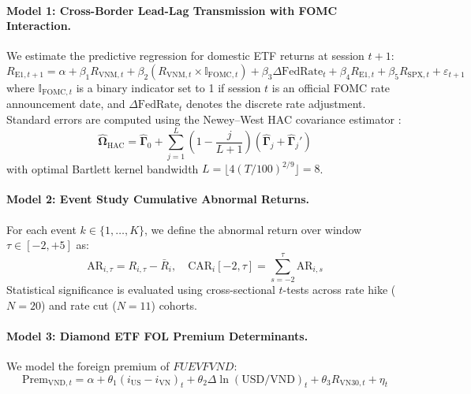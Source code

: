 \documentclass{article}
\begin{document}
\paragraph{Model 1: Cross-Border Lead-Lag Transmission with FOMC Interaction.}
We estimate the predictive regression for domestic ETF returns at session $t+1$:
\begin{equation}
    R_{\text{E1}, t+1} = \alpha + \beta_1 R_{\text{VNM}, t} + \beta_2 (R_{\text{VNM}, t} \times \mathbb{I}_{\text{FOMC}, t}) + \beta_3 \Delta \text{FedRate}_t + \beta_4 R_{\text{E1}, t} + \beta_5 R_{\text{SPX}, t} + \varepsilon_{t+1}
    \label{eq:lead_lag}
\end{equation}
where $\mathbb{I}_{\text{FOMC}, t}$ is a binary indicator set to 1 if session $t$ is an official FOMC rate announcement date, and $\Delta \text{FedRate}_t$ denotes the discrete rate adjustment. Standard errors are computed using the Newey--West HAC covariance estimator \citep{newey1987simple}:
\begin{equation}
    \hat{\boldsymbol{\Omega}}_{\text{HAC}} = \hat{\boldsymbol{\Gamma}}_0 + \sum_{j=1}^{L} \left(1 - \frac{j}{L+1}\right) (\hat{\boldsymbol{\Gamma}}_j + \hat{\boldsymbol{\Gamma}}_j')
\end{equation}
with optimal Bartlett kernel bandwidth $L = \lfloor 4 (T/100)^{2/9} \rfloor = 8$.

\paragraph{Model 2: Event Study Cumulative Abnormal Returns.}
For each event $k \in \{1, \dots, K\}$, we define the abnormal return over window $\tau \in [-2, +5]$ as:
\begin{equation}
    \text{AR}_{i, \tau} = R_{i, \tau} - \bar{R}_i, \quad \text{CAR}_i[-2, \tau] = \sum_{s=-2}^{\tau} \text{AR}_{i, s}
\end{equation}
Statistical significance is evaluated using cross-sectional $t$-tests across rate hike ($N=20$) and rate cut ($N=11$) cohorts.

\paragraph{Model 3: Diamond ETF FOL Premium Determinants.}
We model the foreign premium of $FUEVFVND$:
\begin{equation}
    \text{Prem}_{\text{VND}, t} = \alpha + \theta_1 (i_{\text{US}} - i_{\text{VN}})_t + \theta_2 \Delta \ln(\text{USD/VND})_t + \theta_3 R_{\text{VN30}, t} + \eta_t
    \label{eq:diamond}
\end{equation}
\end{document}
